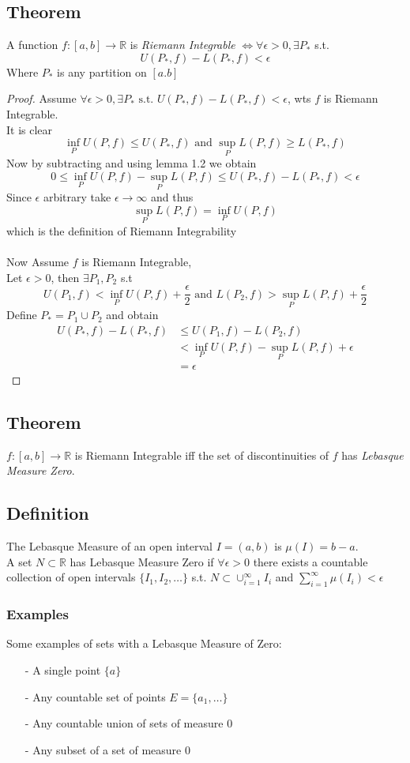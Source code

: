 \documentclass[a4paper, 12pt, twoside]{article}
\begin{document}
\subsection{Theorem}
A function $f:[a,b] \to  \mathbb{R}$ is \emph{Riemann Integrable} $\iff \forall \epsilon>0, \exists P_{*}$ s.t.
$$ U(P_{*},f)-L(P_{*},f)<\epsilon$$
Where $P_{*}$ is any partition on $[a.b]$
\begin{proof}
    Assume $ \forall \epsilon>0, \exists P_{*} \text{ s.t. }  U(P_{*},f)-L(P_{*},f)<\epsilon$, wts $f$ is Riemann Integrable.\\
    It is clear
    $$ \inf_{P}U(P,f)\leq U(P_{*},f) \text{ and } \sup_{P}L(P,f)\geq L(P_{*},f)$$
    Now by subtracting and using lemma 1.2 we obtain
    $$ 0\leq  \inf_{P}U(P,f)-\sup_{P}L(P,f) \leq U(P_{*},f)- L(P_{*},f) < \epsilon$$
    Since $\epsilon$ arbitrary take $\epsilon\to\infty$ and thus
    $$ \sup_{P}L(P,f) = \inf_{P}U(P,f) $$
    which is the definition of Riemann Integrability\\\\
    Now Assume $f$ is Riemann Integrable,\\
    Let $\epsilon>0$, then $\exists P_{1},P_{2}$ s.t
    $$U(P_{1},f) < \inf_{P}U(P,f) + \frac{\epsilon}{2} \text{ and } L(P_{2},f) > \sup_{P}L(P,f) + \frac{\epsilon}{2}$$
    Define $P_{*}=P_{1}\cup P_{2}$ and obtain
    \begin{align*}
         U(P_{*},f)-L(P_{*},f) &\leq U(P_{1},f) - L(P_{2},f)\\
        &< \inf_{P}U(P,f)-\sup_{P}L(P,f)+\epsilon \\
        &= \epsilon
    \end{align*}
\end{proof}
\subsection{Theorem}
$f:[a,b] \to  \mathbb{R}$ is Riemann Integrable iff the set of discontinuities of $f$ has \emph{Lebasque Measure Zero}.
\subsection{Definition}
The Lebasque Measure of an open interval $I=(a,b)$ is $\mu(I)=b-a$.\\
A set $N\subset \mathbb{R}$ has Lebasque Measure Zero if $\forall \epsilon > 0$ there exists a countable collection of open intervals $\{I_{1},I_{2},\dots\}$ s.t. $ N\subset \cup_{i=1}^{\infty}I_{i}$ and $\sum_{i=1}^{\infty}\mu(I_{i})<\epsilon$
\subsubsection{Examples}
Some examples of sets with a Lebasque Measure of Zero:
\begin{itemize}
    \item[-] A single point $\{a\}$
    \item[-] Any countable set of points $E=\{a_{1},\dots\}$
    \item[-] Any countable union of sets of measure $0$
    \item[-] Any subset of a set of measure $0$
\end{itemize}
\end{document}
